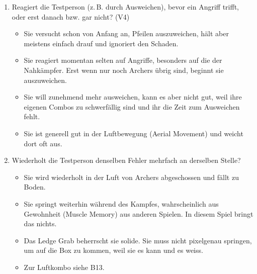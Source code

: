 \documentclass[../Main.tex]{subfiles}
\begin{document}
\begin{enumerate}[label=\textbf{B\arabic*}, leftmargin=1.5cm, itemsep=0.8em]
    \item Reagiert die Testperson (z.\,B. durch Ausweichen), bevor ein Angriff trifft, oder erst danach bzw. gar nicht? \hfill (V4)
    \begin{itemize}[nosep]
        \item Sie versucht schon von Anfang an, Pfeilen auszuweichen, hält aber meistens einfach drauf und ignoriert den Schaden.
        \item Sie reagiert momentan selten auf Angriffe, besonders auf die der Nahkämpfer. Erst wenn nur noch Archers übrig sind, beginnt sie auszuweichen.
        \item Sie will zunehmend mehr ausweichen, kann es aber nicht gut, weil ihre eigenen Combos zu schwerfällig sind und ihr die Zeit zum Ausweichen fehlt.
        \item Sie ist generell gut in der Luftbewegung (Aerial Movement) und weicht dort oft aus.
    \end{itemize}

    \item Wiederholt die Testperson denselben Fehler mehrfach an derselben Stelle?
    \begin{itemize}[nosep]
        \item Sie wird wiederholt in der Luft von Archers abgeschossen und fällt zu Boden.
        \item Sie springt weiterhin während des Kampfes, wahrscheinlich aus Gewohnheit (Muscle Memory) aus anderen Spielen. In diesem Spiel bringt das nichts.
        \item Das Ledge Grab beherrscht sie solide. Sie muss nicht pixelgenau springen, um auf die Box zu kommen, weil sie es kann und es weiss.
        \item Zur Luftkombo siehe B13.
    \end{itemize}
\end{enumerate}
\end{document}
